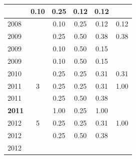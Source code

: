 \begin{table}[H]
\begin{tabular}{| l | c | c | c | c | c |}
          &
          0.10
          &
          0.25
          &
          0.12
          &
            {\color{red} 0.12}
          \\
\hline
            2008
          &
          
          &
          0.10
          &
          0.25
          &
          0.12
          &
            {\color{red} 0.12}
          \\
\hline
            2009
          &
          
          &
          0.25
          &
          0.50
          &
          0.38
          &
            {\color{red} 0.38}
          \\
            2009
          &
          
          &
          0.10
          &
          0.50
          &
          0.15
          &
          \\
            2009
          &
          
          &
          0.10
          &
          0.50
          &
          0.15
          &
          \\
\hline
            2010
          &
          
          &
          0.25
          &
          0.25
          &
          0.31
          &
            {\color{red} 0.31}
          \\
\hline
            2011
          &
          3
          &
          0.25
          &
          0.25
          &
          0.31
          &
            {\color{blue} 1.00}
          \\
            2011
          &
          
          &
          0.25
          &
          0.50
          &
          0.38
          &
          \\
            {\bf 2011}
          &
          
          &
          1.00
          &
          0.25
          &
          1.00
          &
          \\
\hline
            2012
          &
          5
          &
          0.25
          &
          0.25
          &
          0.31
          &
            {\color{blue} 1.00}
          \\
            2012
          &
          
          &
          0.25
          &
          0.50
          &
          0.38
          &
          \\
            2012
          &
          

\end{tabular}
\end{table}
